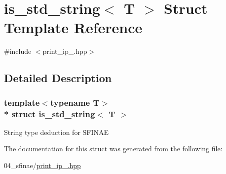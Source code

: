 \hypertarget{structis__std__string}{}\section{is\+\_\+std\+\_\+string$<$ T $>$ Struct Template Reference}
\label{structis__std__string}


{\ttfamily \#include $<$print\+\_\+ip\+\_.\+hpp$>$}



\subsection{Detailed Description}
\subsubsection*{template$<$typename T$>$\\*
struct is\+\_\+std\+\_\+string$<$ T $>$}

String type deduction for S\+F\+I\+N\+AE 

The documentation for this struct was generated from the following file\+:\begin{DoxyCompactItemize}
\item 
04\+\_\+sfinae/\hyperlink{print__ip__04_8hpp}{print\+\_\+ip\+\_.\+hpp}\end{DoxyCompactItemize}
